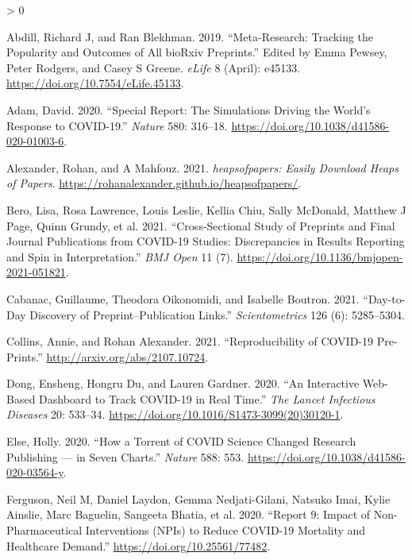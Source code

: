 \documentclass[
]{article}
\newlength{\cslhangindent}
\newenvironment{CSLReferences}[2] %
 {%
  \setlength{\parindent}{0pt}
  \ifodd #1 \everypar{\setlength{\hangindent}{\cslhangindent}}\ignorespaces\fi
  \ifnum #2 > 0
  \setlength{\parskip}{#2\baselineskip}
  \fi
 }%
 {}
\begin{document}
\hypertarget{refs}{}
\begin{CSLReferences}{1}{0}
\leavevmode\hypertarget{ref-abdill2019}{}%
Abdill, Richard J, and Ran Blekhman. 2019. {``Meta-Research: Tracking the Popularity and Outcomes of All bioRxiv Preprints.''} Edited by Emma Pewsey, Peter Rodgers, and Casey S Greene. \emph{eLife} 8 (April): e45133. \url{https://doi.org/10.7554/eLife.45133}.

\leavevmode\hypertarget{ref-adam2020}{}%
Adam, David. 2020. {``Special Report: The Simulations Driving the World's Response to COVID-19.''} \emph{Nature} 580: 316--18. \url{https://doi.org/10.1038/d41586-020-01003-6}.

\leavevmode\hypertarget{ref-citealexandermafouz}{}%
Alexander, Rohan, and A Mahfouz. 2021. \emph{{heapsofpapers: Easily Download Heaps of Papers}}. \url{https://rohanalexander.github.io/heapsofpapers/}.

\leavevmode\hypertarget{ref-Beroe051821}{}%
Bero, Lisa, Rosa Lawrence, Louis Leslie, Kellia Chiu, Sally McDonald, Matthew J Page, Quinn Grundy, et al. 2021. {``Cross-Sectional Study of Preprints and Final Journal Publications from COVID-19 Studies: Discrepancies in Results Reporting and Spin in Interpretation.''} \emph{BMJ Open} 11 (7). \url{https://doi.org/10.1136/bmjopen-2021-051821}.

\leavevmode\hypertarget{ref-cabanac2021day}{}%
Cabanac, Guillaume, Theodora Oikonomidi, and Isabelle Boutron. 2021. {``Day-to-Day Discovery of Preprint--Publication Links.''} \emph{Scientometrics} 126 (6): 5285--5304.

\leavevmode\hypertarget{ref-collins2021reproducibility}{}%
Collins, Annie, and Rohan Alexander. 2021. {``Reproducibility of COVID-19 Pre-Prints.''} \url{http://arxiv.org/abs/2107.10724}.

\leavevmode\hypertarget{ref-citeCSSE}{}%
Dong, Ensheng, Hongru Du, and Lauren Gardner. 2020. {``An Interactive Web-Based Dashboard to Track COVID-19 in Real Time.''} \emph{The Lancet Infectious Diseases} 20: 533--34. \url{https://doi.org/10.1016/S1473-3099(20)30120-1}.

\leavevmode\hypertarget{ref-else2020}{}%
Else, Holly. 2020. {``How a Torrent of COVID Science Changed Research Publishing --- in Seven Charts.''} \emph{Nature} 588: 553. \url{https://doi.org/10.1038/d41586-020-03564-y}.

\leavevmode\hypertarget{ref-ferguson2020}{}%
Ferguson, Neil M, Daniel Laydon, Gemma Nedjati-Gilani, Natsuko Imai, Kylie Ainslie, Marc Baguelin, Sangeeta Bhatia, et al. 2020. {``Report 9: Impact of Non-Pharmaceutical Interventions (NPIs) to Reduce COVID-19 Mortality and Healthcare Demand.''} \url{https://doi.org/10.25561/77482}.


\end{CSLReferences}
\end{document}
